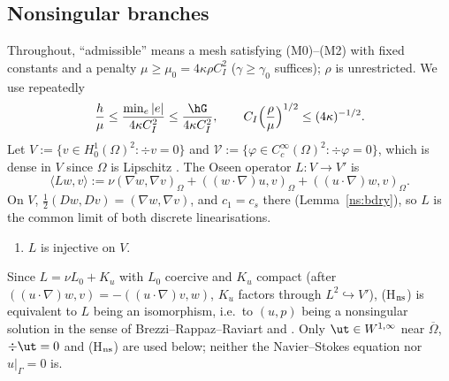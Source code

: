 
\subsection{Nonsingular branches}\label{ns:branchsec}

Throughout, ``admissible'' means a mesh satisfying (M0)--(M2) with fixed constants and a penalty $\mu\ge\mu_0=4\kappa\rho C_I^2$
($\gamma\ge\gamma_0$ suffices); $\rho$ is unrestricted. We use repeatedly
\begin{equation}\label{nb:hmu}
\frac h\mu\le\frac{\min_e|e|}{4\kappa C_I^2}\le\frac{\hG}{4\kappa C_I^2},\qquad C_I\Bigl(\frac\rho\mu\Bigr)^{1/2}\le(4\kappa)^{-1/2}.
\end{equation}
Let $V:=\{v\in H^1_0(\Omega)^2:\div v=0\}$ and $\mathcal V:=\{\varphi\in C^\infty_c(\Omega)^2:\div\varphi=0\}$, which is dense in $V$ since $\Omega$ is
Lipschitz \cite[Ch.~I, Thm~1.6]{Temam}. The Oseen operator $L:V\to V'$ is
\[
\langle Lw,v\rangle:=\nu(\nabla w,\nabla v)_\Omega+((w\cdot\nabla)u,v)_\Omega+((u\cdot\nabla)w,v)_\Omega .
\]
On $V$, $\frac12(Dw,Dv)=(\nabla w,\nabla v)$, and $c_1=c_s$ there (Lemma~\ref{ns:bdry}), so $L$ is the common limit of both discrete linearisations.

\begin{enumerate}
\item[(H$_{\rm ns}$)] $L$ is injective on $V$.
\end{enumerate}
Since $L=\nu L_0+K_u$ with $L_0$ coercive and $K_u$ compact (after $((u\cdot\nabla)w,v)=-((u\cdot\nabla)v,w)$, $K_u$ factors through
$L^2\hookrightarrow V'$), (H$_{\rm ns}$) is equivalent to $L$ being an isomorphism, i.e.\ to $(u,p)$ being a nonsingular solution in the
sense of Brezzi--Rappaz--Raviart \cite{BRR1980} and \cite[Ch.~IV]{GiraultRaviart}.
Only $\ut\in W^{1,\infty}$ near $\overline\Omega$, $\div\ut=0$ and (H$_{\rm ns}$) are used below; neither the Navier--Stokes equation nor $u|_\Gamma=0$ is.

